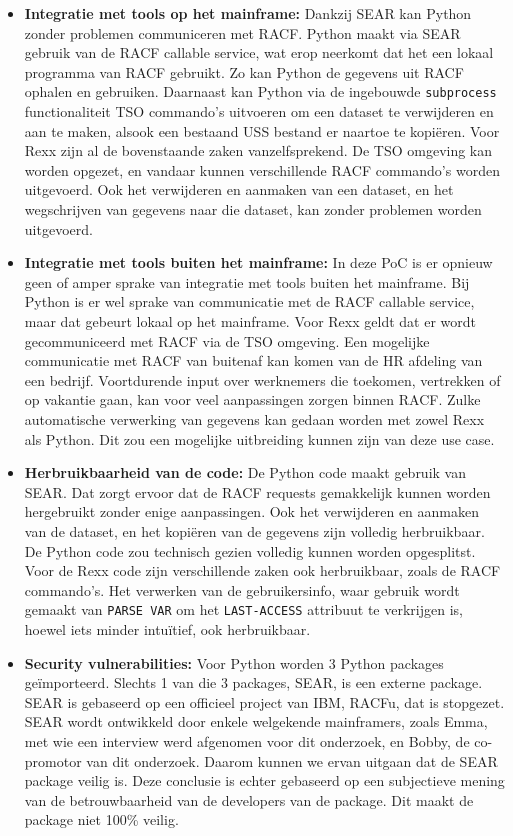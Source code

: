\begin{itemize}
\item \textbf{Integratie met tools op het mainframe:}
Dankzij SEAR kan Python zonder problemen communiceren met RACF. Python maakt via SEAR gebruik van de RACF callable service, wat erop neerkomt dat het een lokaal programma van RACF gebruikt. Zo kan Python de gegevens uit RACF ophalen en gebruiken. Daarnaast kan Python via de ingebouwde \texttt{subprocess} functionaliteit TSO commando's uitvoeren om een dataset te verwijderen en aan te maken, alsook een bestaand USS bestand er naartoe te kopiëren. Voor Rexx zijn al de bovenstaande zaken vanzelfsprekend. De TSO omgeving kan worden opgezet, en vandaar kunnen verschillende RACF commando's worden uitgevoerd. Ook het verwijderen en aanmaken van een dataset, en het wegschrijven van gegevens naar die dataset, kan zonder problemen worden uitgevoerd.
    
\item \textbf{Integratie met tools buiten het mainframe:}
In deze PoC is er opnieuw geen of amper sprake van integratie met tools buiten het mainframe. Bij Python is er wel sprake van communicatie met de RACF callable service, maar dat gebeurt lokaal op het mainframe. Voor Rexx geldt dat er wordt gecommuniceerd met RACF via de TSO omgeving. Een mogelijke communicatie met RACF van buitenaf kan komen van de HR afdeling van een bedrijf. Voortdurende input over werknemers die toekomen, vertrekken of op vakantie gaan, kan voor veel aanpassingen zorgen binnen RACF. Zulke automatische verwerking van gegevens kan gedaan worden met zowel Rexx als Python. Dit zou een mogelijke uitbreiding kunnen zijn van deze use case.
    
\item \textbf{Herbruikbaarheid van de code:}
De Python code maakt gebruik van SEAR. Dat zorgt ervoor dat de RACF requests gemakkelijk kunnen worden hergebruikt zonder enige aanpassingen. Ook het verwijderen en aanmaken van de dataset, en het kopiëren van de gegevens zijn volledig herbruikbaar. De Python code zou technisch gezien volledig kunnen worden opgesplitst. Voor de Rexx code zijn verschillende zaken ook herbruikbaar, zoals de RACF commando's. Het verwerken van de gebruikersinfo, waar gebruik wordt gemaakt van \texttt{PARSE VAR} om het \texttt{LAST-ACCESS} attribuut te verkrijgen is, hoewel iets minder intuïtief, ook herbruikbaar.
    
\item \textbf{Security vulnerabilities:}
Voor Python worden 3 Python packages geïmporteerd. Slechts 1 van die 3 packages, SEAR, is een externe package. SEAR is gebaseerd op een officieel project van IBM, RACFu, dat is stopgezet. SEAR wordt ontwikkeld door enkele welgekende mainframers, zoals Emma, met wie een interview werd afgenomen voor dit onderzoek, en Bobby, de co-promotor van dit onderzoek. Daarom kunnen we ervan uitgaan dat de SEAR package veilig is. Deze conclusie is echter gebaseerd op een subjectieve mening van de betrouwbaarheid van de developers van de package. Dit maakt de package niet 100\% veilig.
    

\end{itemize}
